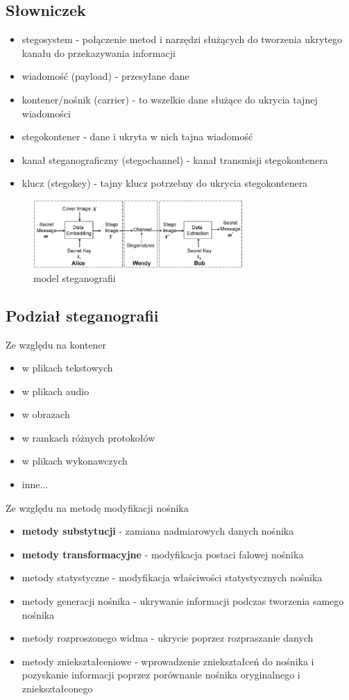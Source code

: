 \documentclass{article}
\begin{document}
\subsection{Słowniczek}
\begin{itemize}
	\item stegosystem - połączenie metod i narzędzi służących do tworzenia ukrytego kanału do przekazywania informacji
	\item wiadomość (payload) - przesyłane dane
	\item kontener/nośnik (carrier) - to wszelkie dane służące do ukrycia tajnej wiadomości
	\item stegokontener - dane i ukryta w nich tajna wiadomość
	\item kanał steganograficzny (stegochannel) - kanał transmisji stegokontenera
	\item klucz (stegokey) - tajny klucz potrzebny do ukrycia stegokontenera
\end{itemize}
\begin{figure}
	\centering
	\includegraphics[width=8cm]{model_steganografii}
	\caption{model steganografii}
\end{figure}
\subsection{Podział steganografii}
Ze względu na kontener
\begin{itemize}
	\item w plikach tekstowych
	\item w plikach audio
	\item w obrazach
	\item w ramkach różnych protokołów
	\item w plikach wykonawczych
	\item inne...
\end{itemize}
Ze względu na metodę modyfikacji nośnika
\begin{itemize}
	\item \textbf{metody substytucji} - zamiana nadmiarowych danych nośnika
	\item \textbf{metody transformacyjne} - modyfikacja postaci falowej nośnika
	\item metody statystyczne - modyfikacja właściwości statystycznych nośnika
	\item metody generacji nośnika - ukrywanie informacji podczas tworzenia samego nośnika
	\item metody rozproszonego widma - ukrycie poprzez rozpraszanie danych
	\item metody zniekształceniowe - wprowadzenie zniekształceń do nośnika i pozyskanie informacji poprzez porównanie nośnika oryginalnego i zniekształconego
\end{itemize}
\end{document}
